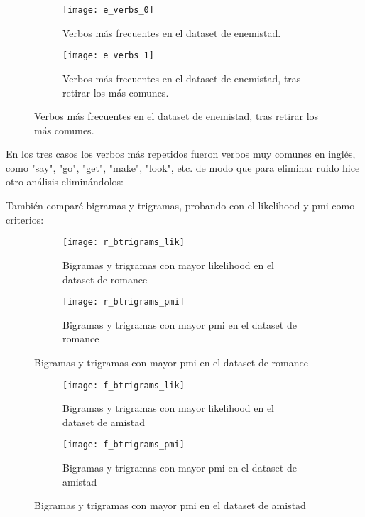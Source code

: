 \documentclass{pre-tfg}
\begin{document}
\begin{figure}
	\centering
	\begin{subfigure}{\textwidth}
		\texttt{[image: e\_verbs\_0]}
		\caption{Verbos más frecuentes en el dataset de enemistad.}
		\label{fig:e_verb_freq_in_dataset}
		
	\end{subfigure}
	\begin{subfigure}{\textwidth}
		\texttt{[image: e\_verbs\_1]}
		\caption{Verbos más frecuentes en el dataset de enemistad, tras retirar los más comunes.}
		\label{fig:e_verb_freq_removed}
	\end{subfigure}
	
	
\end{figure}

En los tres casos los verbos más repetidos fueron verbos muy comunes en inglés, como "say", "go", "get", "make", "look", etc. de modo que para eliminar ruido hice otro análisis eliminándolos:

También comparé bigramas y trigramas, probando con el likelihood y pmi como criterios:

\begin{figure}
	\centering
	\begin{subfigure}{\textwidth}
		\texttt{[image: r\_btrigrams\_lik]}
		\caption{Bigramas y trigramas con mayor likelihood en el dataset de romance}
		\label{fig:r_btrigram_lik}
		
	\end{subfigure}
	\begin{subfigure}{\textwidth}
		\texttt{[image: r\_btrigrams\_pmi]}
		\caption{Bigramas y trigramas con mayor pmi en el dataset de romance}
		\label{fig:r_btrigram_pmi}
	\end{subfigure}
	
	
\end{figure}

\begin{figure}
	\centering
	\begin{subfigure}{\textwidth}
		\texttt{[image: f\_btrigrams\_lik]}
		\caption{Bigramas y trigramas con mayor likelihood en el dataset de amistad}
		\label{fig:f_btrigram_lik}
		
	\end{subfigure}
	\begin{subfigure}{\textwidth}
		\texttt{[image: f\_btrigrams\_pmi]}
		\caption{Bigramas y trigramas con mayor pmi en el dataset de amistad}
		\label{fig:f_btrigram_pmi}
	\end{subfigure}
	
	
\end{figure}
\end{document}
